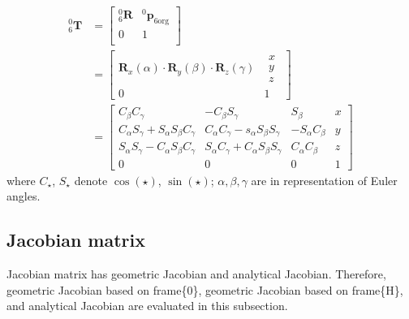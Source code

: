 \begin{equation}
\begin{split}
^0_6\mathbf{T} 
&=
\begin{bmatrix}
^0_6\mathbf{R}	&^0\boldsymbol{p}_\mathrm{6org}\\
0				&1\\
\end{bmatrix}\\
&= 
\begin{bmatrix}
\mathbf{R}_x(\alpha ) \cdot \mathbf{R}_y(\beta ) \cdot \mathbf{R}_z(\gamma ) 
& \begin{matrix}
x\\ 
y\\ 
z
\end{matrix}\\ 
0 & 1
\end{bmatrix}\\
&= 
\begin{bmatrix} 
C_\beta C_\gamma 										& -C_\beta S_\gamma 									& S_\beta 					&x\\ 
C_\alpha S_\gamma +  S_\alpha S_\beta C_\gamma 			& C_\alpha C_\gamma -  s_\alpha S_\beta S_\gamma		& -S_\alpha C_\beta			&y\\ 
S_\alpha S_\gamma -  C_\alpha S_\beta C_\gamma 			& S_\alpha C_\gamma +  C_\alpha S_\beta S_\gamma 		& C_\alpha C_\beta 			&z\\ 
0 														&0 														&0							&1
\end{bmatrix}
\end{split}
\end{equation}
where $C_{\star} $, $ S_{\star}$ denote $\cos \left(\star \right)$, $\sin \left(\star \right)$; $\alpha ,\beta ,\gamma$ are in representation of Euler angles.
\subsection*	{Jacobian matrix} 
\label{sec:jacobian}
\hspace*{6mm}Jacobian matrix has geometric Jacobian and analytical Jacobian. Therefore, geometric Jacobian based on frame\{0\}, geometric Jacobian based on frame\{H\}, and analytical Jacobian are evaluated in this subsection.
